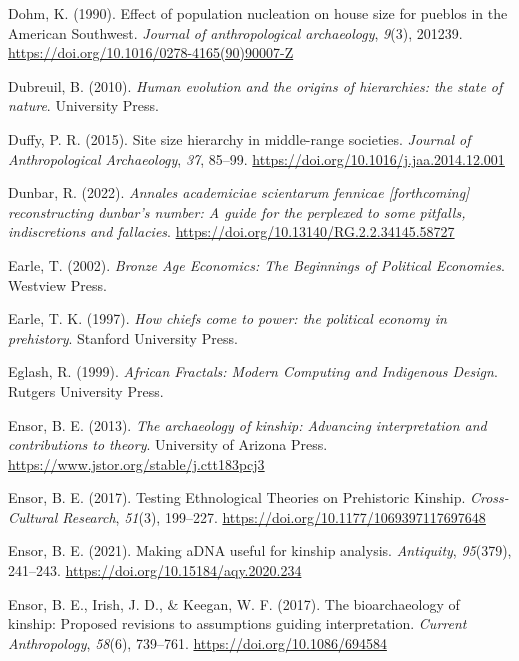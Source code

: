 \documentclass[
  12pt,
]{book}
\newlength{\cslhangindent}
\newlength{\cslentryspacingunit} %
\newenvironment{CSLReferences}[2] %
 {%
  \setlength{\parindent}{0pt}
  \ifodd #1
  \let\oldpar\par
  \def\par{\hangindent=\cslhangindent\oldpar}
  \fi
  \setlength{\parskip}{#2\cslentryspacingunit}
 }%
 {}
\begin{document}
\begin{CSLReferences}{1}{0}
\leavevmode{}%
Dohm, K. (1990). Effect of population nucleation on house size for pueblos in the American Southwest. \emph{Journal of anthropological archaeology}, \emph{9}(3), 201239. \url{https://doi.org/10.1016/0278-4165(90)90007-Z}

\leavevmode{}%
Dubreuil, B. (2010). \emph{Human evolution and the origins of hierarchies: the state of nature}. University Press.

\leavevmode{}%
Duffy, P. R. (2015). Site size hierarchy in middle-range societies. \emph{Journal of Anthropological Archaeology}, \emph{37}, 85--99. \url{https://doi.org/10.1016/j.jaa.2014.12.001}

\leavevmode{}%
Dunbar, R. (2022). \emph{Annales academiciae scientarum fennicae {[}forthcoming{]} reconstructing dunbar's number: A guide for the perplexed to some pitfalls, indiscretions and fallacies}. \url{https://doi.org/10.13140/RG.2.2.34145.58727}

\leavevmode{}%
Earle, T. (2002). \emph{Bronze Age Economics: The Beginnings of Political Economies}. Westview Press.

\leavevmode{}%
Earle, T. K. (1997). \emph{How chiefs come to power: the political economy in prehistory}. Stanford University Press.

\leavevmode{}%
Eglash, R. (1999). \emph{African Fractals: Modern Computing and Indigenous Design}. Rutgers University Press.

\leavevmode{}%
Ensor, B. E. (2013). \emph{The archaeology of kinship: Advancing interpretation and contributions to theory}. University of Arizona Press. \url{https://www.jstor.org/stable/j.ctt183pcj3}

\leavevmode{}%
Ensor, B. E. (2017). Testing Ethnological Theories on Prehistoric Kinship. \emph{Cross-Cultural Research}, \emph{51}(3), 199--227. \url{https://doi.org/10.1177/1069397117697648}

\leavevmode{}%
Ensor, B. E. (2021). Making aDNA useful for kinship analysis. \emph{Antiquity}, \emph{95}(379), 241--243. \url{https://doi.org/10.15184/aqy.2020.234}

\leavevmode{}%
Ensor, B. E., Irish, J. D., \& Keegan, W. F. (2017). The bioarchaeology of kinship: Proposed revisions to assumptions guiding interpretation. \emph{Current Anthropology}, \emph{58}(6), 739--761. \url{https://doi.org/10.1086/694584}


\end{CSLReferences}
\end{document}
